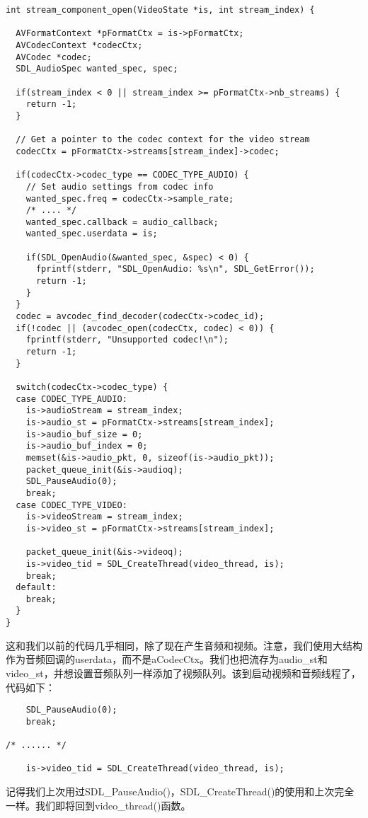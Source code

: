 \begin{lstlisting}
int stream_component_open(VideoState *is, int stream_index) {

  AVFormatContext *pFormatCtx = is->pFormatCtx;
  AVCodecContext *codecCtx;
  AVCodec *codec;
  SDL_AudioSpec wanted_spec, spec;

  if(stream_index < 0 || stream_index >= pFormatCtx->nb_streams) {
    return -1;
  }

  // Get a pointer to the codec context for the video stream
  codecCtx = pFormatCtx->streams[stream_index]->codec;

  if(codecCtx->codec_type == CODEC_TYPE_AUDIO) {
    // Set audio settings from codec info
    wanted_spec.freq = codecCtx->sample_rate;
    /* .... */
    wanted_spec.callback = audio_callback;
    wanted_spec.userdata = is;

    if(SDL_OpenAudio(&wanted_spec, &spec) < 0) {
      fprintf(stderr, "SDL_OpenAudio: %s\n", SDL_GetError());
      return -1;
    }
  }
  codec = avcodec_find_decoder(codecCtx->codec_id);
  if(!codec || (avcodec_open(codecCtx, codec) < 0)) {
    fprintf(stderr, "Unsupported codec!\n");
    return -1;
  }

  switch(codecCtx->codec_type) {
  case CODEC_TYPE_AUDIO:
    is->audioStream = stream_index;
    is->audio_st = pFormatCtx->streams[stream_index];
    is->audio_buf_size = 0;
    is->audio_buf_index = 0;
    memset(&is->audio_pkt, 0, sizeof(is->audio_pkt));
    packet_queue_init(&is->audioq);
    SDL_PauseAudio(0);
    break;
  case CODEC_TYPE_VIDEO:
    is->videoStream = stream_index;
    is->video_st = pFormatCtx->streams[stream_index];

    packet_queue_init(&is->videoq);
    is->video_tid = SDL_CreateThread(video_thread, is);
    break;
  default:
    break;
  }
}
\end{lstlisting}

这和我们以前的代码几乎相同，除了现在产生音频和视频。注意，我们使用大结构作为音频回调的userdata，而不是aCodecCtx。我们也把流存为audio_st和video_st，并想设置音频队列一样添加了视频队列。该到启动视频和音频线程了，代码如下：


\begin{lstlisting}
    SDL_PauseAudio(0);
    break;

/* ...... */

    is->video_tid = SDL_CreateThread(video_thread, is);
\end{lstlisting}

记得我们上次用过SDL_PauseAudio()，SDL_CreateThread()的使用和上次完全一样。我们即将回到video_thread()函数。

